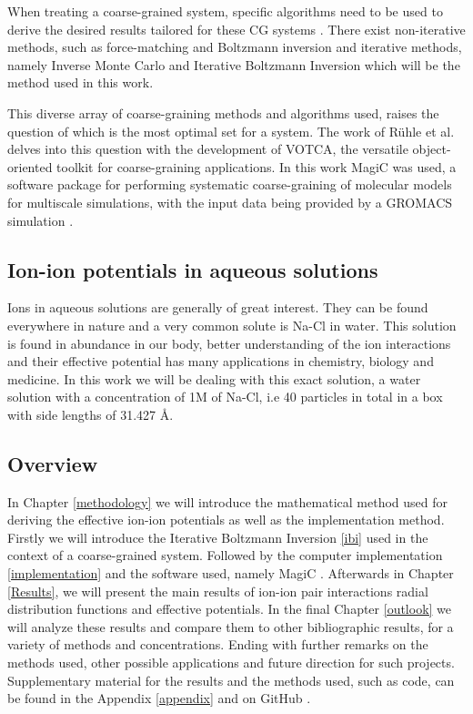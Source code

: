 \documentclass[10pt]{article}
\begin{document}
        When treating a coarse-grained system, specific algorithms need to be used to derive the desired results tailored for these CG systems \cite{Ruhle}. There exist non-iterative methods, such as force-matching and Boltzmann inversion and iterative methods, namely Inverse Monte Carlo and Iterative Boltzmann Inversion which will be the method used in this work. 

        This diverse array of coarse-graining methods and algorithms used, raises the question of which is the most optimal set for a system. The work of Rühle et al. \cite{Ruhle} delves into this question with the development of VOTCA, the versatile object-oriented toolkit for coarse-graining applications. In this work MagiC \cite{Magic} was used, a software package for performing systematic coarse-graining of molecular models for multiscale simulations, with the input data being provided by a GROMACS simulation \cite{Gromacs}.

        
    \subsection{Ion-ion potentials in aqueous solutions}

        Ions in aqueous solutions are generally of great interest. They can be found everywhere in nature and a very common solute is Na-Cl in water. This solution is found in abundance in our body, better understanding of the ion interactions and their effective potential has many applications in chemistry, biology and medicine. In this work we will be dealing with this exact solution, a water solution with a concentration of 1M of Na-Cl, i.e 40 particles in total in a box with side lengths of 31.427 $\si{\angstrom}$.

    \subsection{Overview}

        In Chapter \ref{methodology} we will introduce the mathematical method used for deriving the effective ion-ion potentials as well as the implementation method. Firstly we will introduce the Iterative Boltzmann Inversion \ref{ibi} used in the context of a coarse-grained system. Followed by the computer implementation \ref{implementation} and the software used, namely MagiC \cite{Magic}. Afterwards in Chapter \ref{Results}, we will present the main results of ion-ion pair interactions radial distribution functions and effective potentials. In the final Chapter \ref{outlook} we will analyze these results and compare them to other bibliographic results, for a variety of methods and concentrations. Ending with further remarks on the methods used, other possible applications and future direction for such projects. Supplementary material for the results and the methods used, such as code, can be found in the Appendix \ref{appendix} and on GitHub \cite{GitHub}.
\end{document}
